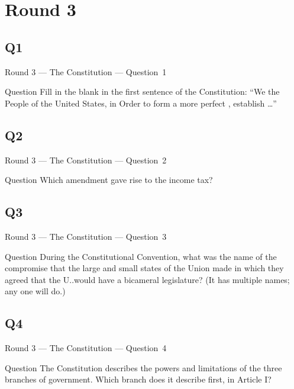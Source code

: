 \documentclass[11pt,draft]{beamer}
\begin{document}
\section{Round 3}
\subsection*{Q1}
\begin{frame}[t]{Round 3 --- The Constitution --- \mbox{Question 1}}
    \begin{block}{Question}
        Fill in the blank in the first sentence of the Constitution: ``We the People of the United States, in Order to form a more perfect \textunderscore{}\textunderscore{}\textunderscore{}\textunderscore{}\textunderscore{}, establish \ldots{}''
    \end{block}
\end{frame}
\subsection*{Q2}
\begin{frame}[t]{Round 3 --- The Constitution --- \mbox{Question 2}}
    \begin{block}{Question}
        Which amendment gave rise to the income tax?
    \end{block}
\end{frame}
\subsection*{Q3}
\begin{frame}[t]{Round 3 --- The Constitution --- \mbox{Question 3}}
    \begin{block}{Question}
        During the Constitutional Convention, what was the name of the compromise that the large and small states of the Union made in which they agreed that the U.\@S.\@ would have a bicameral legislature? (It has multiple names; any one will do.)
    \end{block}
\end{frame}
\subsection*{Q4}
\begin{frame}[t]{Round 3 --- The Constitution --- \mbox{Question 4}}
    \begin{block}{Question}
        The Constitution describes the powers and limitations of the three branches of government. Which branch does it describe first, in Article I\@?
    \end{block}
\end{frame}
\end{document}
